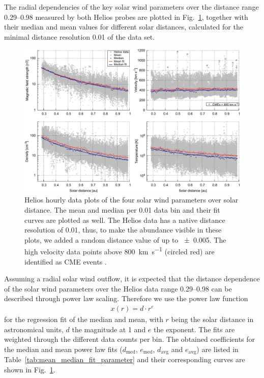 The radial dependencies of the key solar wind parameters over the distance range \SIrange{0.29}{0.98}{\au} measured by both Helios probes are plotted in Fig.~\ref{fig:radial_fit_4_thesis_light_b_skip}, together with their median and mean values for different solar distances, calculated for the minimal distance resolution \SI{0.01}{\au} of the data set.
\begin{figure}
	\includegraphics[width=18cm]{figures/radial_fit_4_thesis_light_b_skip.pdf}
	\caption{Helios hourly data plots of the four solar wind parameters over solar distance. The mean and median per \SI{0.01}{\au} data bin and their fit curves are plotted as well. The Helios data has a native distance resolution of \SI{0.01}{\au}, thus, to make the abundance visible in these plots, we added a random distance value of up to \SI{+-0.005}{\au}. The high velocity data points above \SI{800}{\km\per\s} (circled red) are identified as CME events \citep[e.g.,][]{Sheeley1985,Bothmer1996,Bothmer1998}.}
	\label{fig:radial_fit_4_thesis_light_b_skip}
\end{figure}
Assuming a radial solar wind outflow, it is expected that the distance dependence of the solar wind parameters over the Helios data range \SIrange{0.29}{0.98}{\au} can be described through power law scaling. Therefore we use the power law function
\begin{align}
	x(r) = d\cdot r^e	\label{eq:power_function}
\end{align}
for the regression fit of the median and mean, with $r$ being the solar distance in astronomical units, $d$ the magnitude at \SI{1}{\au} and $e$ the exponent. The fits are weighted through the different data counts per bin.
The obtained coefficients for the median and mean power law fits ($d_\text{med}$, $e_\text{med}$, $d_\text{avg}$ and $e_\text{avg}$) are listed in Table~\ref{tab:mean_median_fit_parameter} and their corresponding curves are shown in Fig.~\ref{fig:radial_fit_4_thesis_light_b_skip}.
